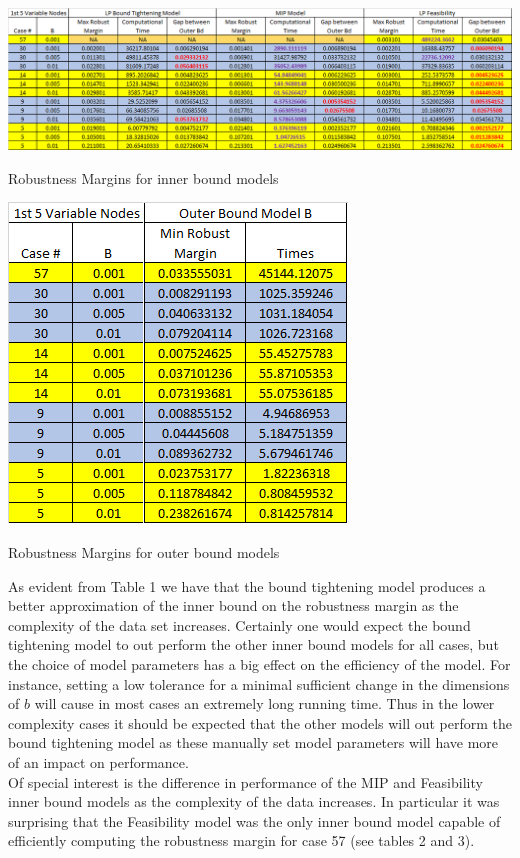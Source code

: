 \documentclass[11pt]{article}
\theoremstyle{plain}
\theoremstyle{definition}
\theoremstyle{remark}
\begin{document}
\begin{table}[h]
\begin{center}
\includegraphics[scale=0.6]{Figures/InnerBoundTable}
\caption{Robustness Margins for inner bound models } 
\vspace{0.2in}
\includegraphics[scale=0.5]{Figures/OuterBoundTable}
\caption{Robustness Margins for outer bound models}
\end{center}
\end{table} 

As evident from Table 1 we have that the bound tightening model produces a better approximation of the inner bound on the robustness margin as the complexity of the data set increases. Certainly one would expect the bound tightening model to out perform the other inner bound models for all cases, but the choice of model parameters has a big effect on the efficiency of the model. For instance, setting a low tolerance for a minimal sufficient change in the dimensions of $b$ will cause in most cases an extremely long running time. Thus in the lower complexity cases it should be expected that the other models will out perform the bound tightening model as these manually set model parameters will have more of an impact on performance. \\
Of special interest is the difference in performance of the MIP and Feasibility inner bound models as the complexity of the data increases. In particular it was surprising that the Feasibility model was the only inner bound model capable of efficiently computing the robustness margin for case 57 (see tables 2 and 3). 
\end{document}
